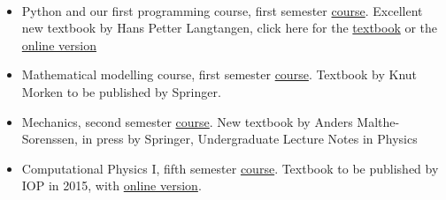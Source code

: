 \documentclass[%
twoside,                 %
final,                   %
10pt]{article}
\begin{document}
\paragraph{}
\begin{itemize}
\item Python and our first programming course, first semester \href{{http://www.uio.no/studier/emner/matnat/ifi/INF1100/h14/}}{course}. Excellent new textbook by Hans Petter Langtangen, click here for the \href{{http://www.amazon.com/Scientific-Programming-Computational-Science-Engineering-ebook/dp/B00DGER1NQ/ref=sr_1_2?ie=UTF8&qid=1425382942&sr=8-2&keywords=langtangen}}{textbook} or the \href{{http://hplgit.github.io/primer.html/doc/web/index.html}}{online version}

\item Mathematical modelling course, first semester \href{{http://www.uio.no/studier/emner/matnat/math/MAT-INF1100/h14/}}{course}. Textbook by Knut Morken to be published by Springer.

\item Mechanics, second semester \href{{http://www.uio.no/studier/emner/matnat/fys/FYS-MEK1100/v12/}}{course}. New textbook by Anders Malthe-Sorenssen, in press by Springer, Undergraduate Lecture Notes in Physics

\item Computational Physics I, fifth semester \href{{http://www.uio.no/studier/emner/matnat/fys/FYS3150/h14/}}{course}. Textbook to be published by IOP in 2015, with \href{{http://www.uio.no/studier/emner/matnat/fys/FYS3150/h14/undervisningsmateriale/Lecture%20Notes/lecture2014.pdf}}{online version}.
\end{itemize}

\noindent





\printindex
\end{document}
